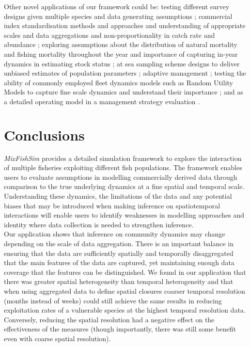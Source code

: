 \documentclass[review]{elsarticle}
\begin{document}
Other novel applications of our framework could be: testing different survey
designs given multiple species and data generating assumptions \citep{Xu2015};
commercial index standardisation methods and approaches and understanding of
appropriate scales and data aggregations and non-proportionality in catch rate
and abundance \citep{Harley2001, Maunder2004}; exploring assumptions about the
distribution of natural mortality and fishing mortality throughout the year and
importance of capturing in-year dynamics in estimating stock status
\citep{Liu2013}; at sea sampling scheme designs to deliver unbiased estimates
of population parameters \citep{Cotter2007, Kimura2006}; adaptive management
\citep{Walters2007, Dunn2016}; testing the ability of commonly employed fleet
dynamics models such as Random Utility Models to capture fine scale dynamics
and understand their importance \citep{Girardin2016}; and as a detailed
operating model in a management strategy evaluation \citep{Mahevas2004}. \\

\section{Conclusions}

\textit{MixFishSim} provides a detailed simulation framework to explore the
interaction of multiple fisheries exploiting different fish populations. The
framework enables users to evaluate assumptions in modelling commercially
derived data through comparison to the true underlying dynamics at a fine
spatial and temporal scale.  Understanding these dynamics, the limitations of
the data and any potential biases that may be introduced when making inference
on spatiotemporal interactions will enable users to identify weaknesses in
modelling approaches and identity where data collection is needed to strengthen
inference. \\

Our application shows that inference on community dynamics may change depending
on the scale of data aggregation. There is an important balance in ensuring
that the data are sufficiently spatially and temporally disaggregated that the
main features of the data are captured, yet maintaining enough data coverage
that the features can be distinguished. We found in our application that there
was greater spatial heterogeneity than temporal heterogeneity and that when
using aggregated data to define spatial closures coarser temporal resolution
(months instead of weeks) could still achieve the same results in reducing
exploitation rates of a vulnerable species at the highest temporal resolution
data. Conversely, reducing the spatial resolution had a negative effect on the
effectiveness of the measures (though importantly, there was still some benefit
even with coarse spatial resolution). \\
\end{document}
